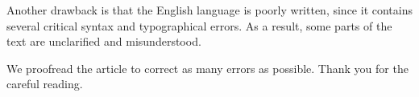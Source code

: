 \documentclass[a4paper,10pt,DIV=16]{scrartcl}
\begin{document}
\begin{revbox}
  Another drawback is that the English language is poorly written, since it contains several critical syntax and typographical errors. As a result, some parts of the text are unclarified and misunderstood.
  \begin{resbox}

    We proofread the article to correct as many errors as possible. Thank you for the careful reading.

  \end{resbox}
\end{revbox}
\end{document}
